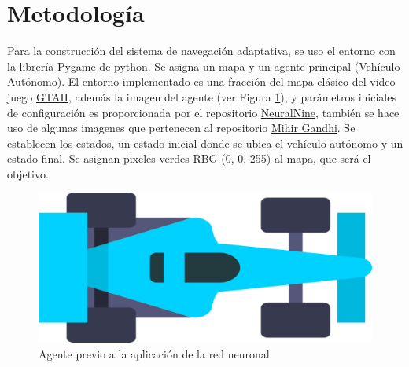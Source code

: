 \documentclass[lettersize, journal]{IEEEtran}
\begin{document}

\section{Metodología}
Para la construcción del sistema de navegación adaptativa, se uso el entorno con la librería \href{https://www.pygame.org/wiki/GettingStarted}{Pygame} de python. Se asigna un mapa y un agente principal (Vehículo Autónomo). El entorno implementado es una fracción del mapa clásico del video juego \href{https://www.rockstargames.com/games/gta2}{GTAII}, además la imagen del agente (ver Figura \ref{fig:agente}), y parámetros iniciales de configuración es proporcionada por el repositorio \href{https://github.com/NeuralNine/ai-car-simulation}{NeuralNine}, también se hace uso de algunas imagenes que pertenecen al repositorio \href{https://github.com/mihir-m-gandhi/Traffic-Intersection-Simulation-with-Stats}{Mihir Gandhi}.
Se establecen los estados, un estado inicial donde se ubica el vehículo autónomo y un estado final. Se asignan pixeles verdes RBG (0, 0, 255) al mapa, que será el objetivo.
\begin{figure}[H]
    \centering    \includegraphics[width=0.3\linewidth]{images/car.png}
    \caption{Agente previo a la aplicación de la red neuronal}
    \label{fig:agente}
\end{figure}
\end{document}
